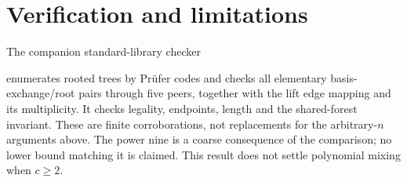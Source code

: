 \documentclass[11pt]{article}
\begin{document}
\section{Verification and limitations}
The companion standard-library checker
\begin{center}\small{}\end{center}
enumerates rooted trees by Pr\"ufer codes and checks all elementary
basis-exchange/root pairs through five peers, together with the lift
edge mapping and its multiplicity. It checks legality, endpoints,
length and the shared-forest invariant. These are finite corroborations,
not replacements for the arbitrary-$n$ arguments above. The power nine
is a coarse consequence of the comparison; no lower bound matching it
is claimed. This result does not settle polynomial mixing when $c\ge2$.
\end{document}
